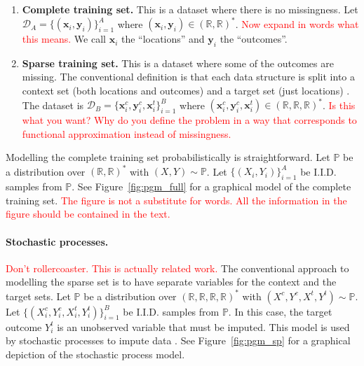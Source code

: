 \documentclass[a4paper,12pt,twoside,openright]{report}
\newcommand{\crit}[1]{\textcolor{red}{#1}}
\begin{document}
\begin{enumerate}
    \item \textbf{Complete training set.} This is a dataset where there is no missingness. Let $\mathcal{D}_A = \{(\mathbf{x}_i, \mathbf{y}_i)\}_{i=1}^{A}$ where $(\mathbf{x}_i, \mathbf{y}_i) \in (\mathbb{R}, \mathbb{R})^*$. \crit{Now expand in words what this means.
    } We call $\mathbf{x}_i$ the ``locations'' and $\mathbf{y}_i$ the ``outcomes''.
    \item \textbf{Sparse training set.} This is a dataset where some of the outcomes are missing. The conventional definition is that each data structure is split into a context set (both locations and outcomes) and a target set (just locations) \parencite{garneloConditionalNeuralProcesses2018}. The dataset is $\mathcal{D}_B = \{\mathbf{x}^c_i, \mathbf{y}^c_i, \mathbf{x}^t_i\}_{i=1}^{B}$ where $(\mathbf{x}^c_i, \mathbf{y}^c_i, \mathbf{x}^t_i) \in (\mathbb{R}, \mathbb{R}, \mathbb{R})^*$. \crit{Is this what you want? Why do you define the problem in a way that corresponds to functional approximation instead of missingness.}
\end{enumerate}

Modelling the complete training set probabilistically is straightforward. Let $\mathbb{P}$ be a distribution over $(\mathbb{R}, \mathbb{R})^*$ with $(X, Y) \sim \mathbb{P}$. Let $\{(X_i, Y_i)\}_{i=1}^{A}$ be I.I.D. samples from $\mathbb{P}$. See Figure~\ref{fig:pgm_full} for a graphical model of the complete training set. \crit{The figure is not a substitute for words. All the information in the figure should be contained in the text.}

\paragraph{Stochastic processes.} \crit{Don't rollercoaster. This is actually related work.} The conventional approach to modelling the sparse set is to have separate variables for the context and the target sets. Let $\mathbb{P}$ be a distribution over $(\mathbb{R}, \mathbb{R}, \mathbb{R}, \mathbb{R})^*$ with $(X^c, Y^c, X^t, Y^t) \sim \mathbb{P}$. Let $\{(X^c_i, Y^c_i, X^t_i, Y^t_i)\}_{i=1}^{B}$ be I.I.D. samples from $\mathbb{P}$. In this case, the target outcome $Y^t_i$ is an unobserved variable that must be imputed. This model is used by stochastic processes to impute data \parencite{jafrastehGaussianProcessesMissing2022, garneloConditionalNeuralProcesses2018}. See Figure~\ref{fig:pgm_sp} for a graphical depiction of the stochastic process model.
\end{document}

